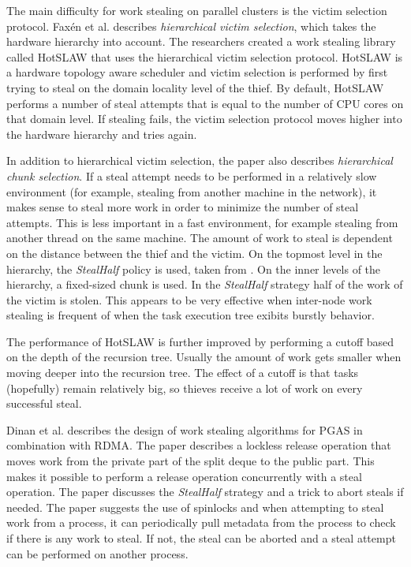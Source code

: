 The main difficulty for work stealing on parallel clusters is the victim selection protocol. Faxén et al. \cite{Faxen:2011:MWS:2016604.2016617} describes \emph{hierarchical victim selection}, which takes the hardware hierarchy into account. The researchers created a work stealing library called HotSLAW that uses the hierarchical victim selection protocol. HotSLAW is a hardware topology aware scheduler and victim selection is performed by first trying to steal on the domain locality level of the thief. By default, HotSLAW performs a number of steal attempts that is equal to the number of CPU cores on that domain level. If stealing fails, the victim selection protocol moves higher into the hardware hierarchy and tries again. 

In addition to hierarchical victim selection, the paper also describes \emph{hierarchical chunk selection}. If a steal attempt needs to be performed in a relatively slow environment (for example, stealing from another machine in the network), it makes sense to steal more work in order to minimize the number of steal attempts. This is less important in a fast environment, for example stealing from another thread on the same machine. The amount of work to steal is dependent on the distance between the thief and the victim. On the topmost level in the hierarchy, the \emph{StealHalf} policy is used, taken from \cite{dinan2009scalable}. On the inner levels of the hierarchy, a fixed-sized chunk is used. In the \emph{StealHalf} strategy half of the work of the victim is stolen. This appears to be very effective when inter-node work stealing is frequent of when the task execution tree exibits burstly behavior. 

The performance of HotSLAW is further improved by performing a cutoff based on the depth of the recursion tree. Usually the amount of work gets smaller when moving deeper into the recursion tree. The effect of a cutoff is that tasks (hopefully) remain relatively big, so thieves receive a lot of work on every successful steal.

Dinan et al. \cite{dinan2009scalable} describes the design of work stealing algorithms for PGAS in combination with RDMA. The paper describes a lockless release operation that moves work from the private part of the split deque to the public part. This makes it possible to perform a release operation concurrently with a steal operation. The paper discusses the \emph{StealHalf} strategy and a trick to abort steals if needed. The paper suggests the use of spinlocks and when attempting to steal work from a process, it can periodically pull metadata from the process to check if there is any work to steal. If not, the steal can be aborted and a steal attempt can be performed on another process.

